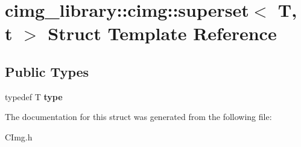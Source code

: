 \hypertarget{structcimg__library_1_1cimg_1_1superset}{\section{cimg\-\_\-library\-:\-:cimg\-:\-:superset$<$ T, t $>$ Struct Template Reference}
\label{structcimg__library_1_1cimg_1_1superset}
}
\subsection*{Public Types}
\begin{DoxyCompactItemize}
\item 
\hypertarget{structcimg__library_1_1cimg_1_1superset_a9a0d2bddf36034206eb70a3b6bbf50b4}{typedef T {\bfseries type}}\label{structcimg__library_1_1cimg_1_1superset_a9a0d2bddf36034206eb70a3b6bbf50b4}

\end{DoxyCompactItemize}


The documentation for this struct was generated from the following file\-:\begin{DoxyCompactItemize}
\item 
C\-Img.\-h\end{DoxyCompactItemize}
